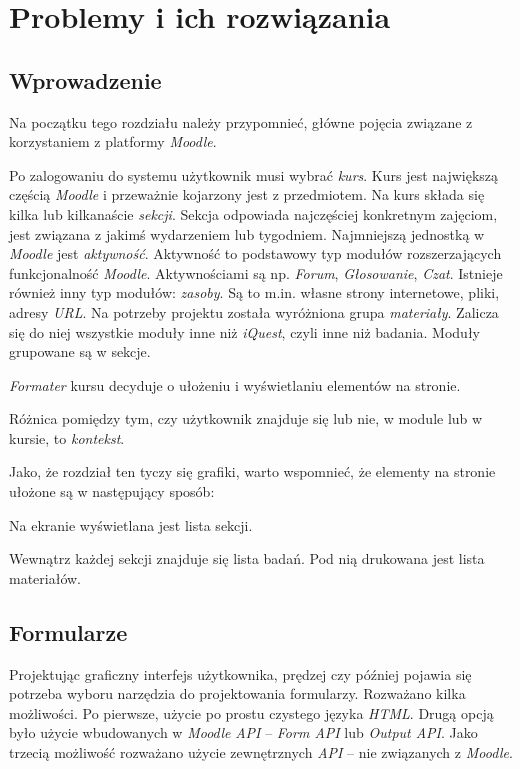 
\section{Problemy i ich rozwiązania}
\label{Chapter81}

\subsection{Wprowadzenie}
Na początku tego rozdziału należy przypomnieć, główne pojęcia związane z korzystaniem z platformy \emph{Moodle}.

Po zalogowaniu do systemu użytkownik musi wybrać \emph{kurs}. Kurs jest największą częścią \emph{Moodle} i przeważnie kojarzony jest z przedmiotem. Na kurs składa się kilka lub kilkanaście \emph{sekcji}. Sekcja odpowiada najczęściej konkretnym zajęciom, jest związana z jakimś wydarzeniem lub tygodniem. Najmniejszą jednostką w \emph{Moodle} jest \emph{aktywność}. Aktywność to podstawowy typ modułów rozszerzających funkcjonalność \emph{Moodle}. Aktywnościami są np. \emph{Forum}, \emph{Głosowanie}, \emph{Czat}. Istnieje również inny typ modułów: \emph{zasoby}. Są to m.in. własne strony internetowe, pliki, adresy \emph{URL}. Na potrzeby projektu została wyróżniona grupa \emph{materiały}. Zalicza się do niej wszystkie moduły inne niż \emph{iQuest}, czyli inne niż badania. Moduły grupowane są w sekcje.

\emph{Formater} kursu decyduje o ułożeniu i wyświetlaniu elementów na stronie.

Różnica pomiędzy tym, czy użytkownik znajduje się lub nie, w module lub w kursie, to \emph{kontekst}.

Jako, że rozdział ten tyczy się grafiki, warto wspomnieć, że elementy na stronie ułożone są w następujący sposób:
\begin{description}
\item Na ekranie wyświetlana jest lista sekcji.
\item Wewnątrz każdej sekcji znajduje się lista badań. Pod nią drukowana jest lista materiałów.
\end{description}

\subsection{Formularze}
Projektując graficzny interfejs użytkownika, prędzej czy później pojawia się potrzeba wyboru narzędzia do projektowania formularzy. Rozważano kilka możliwości. Po pierwsze, użycie po prostu czystego języka \emph{HTML}. Drugą opcją było użycie wbudowanych w \emph{Moodle} \emph{API} -- \emph{Form API} lub \emph{Output API}. Jako trzecią możliwość rozważano użycie zewnętrznych \emph{API} -- nie związanych z \emph{Moodle}.

